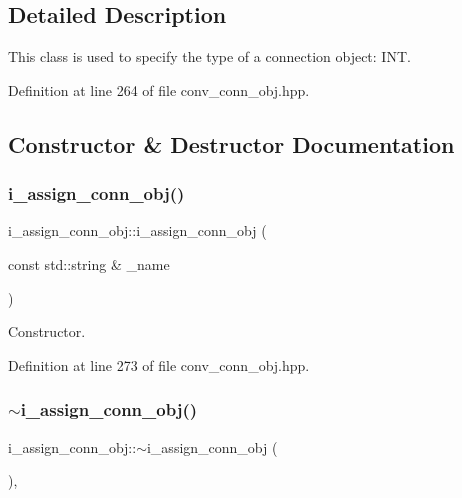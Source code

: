 \subsection{Detailed Description}
This class is used to specify the type of a connection object\+: I\+NT. 

Definition at line 264 of file conv\+\_\+conn\+\_\+obj.\+hpp.



\subsection{Constructor \& Destructor Documentation}
\mbox{\label{classi__assign__conn__obj_aa987d9ecde9d90d5376226743c7a8b93}} 
\subsubsection{\texorpdfstring{i\+\_\+assign\+\_\+conn\+\_\+obj()}{i\_assign\_conn\_obj()}}
{\footnotesize\ttfamily i\+\_\+assign\+\_\+conn\+\_\+obj\+::i\+\_\+assign\+\_\+conn\+\_\+obj (\begin{DoxyParamCaption}\item[{const std\+::string \&}]{\+\_\+name }\end{DoxyParamCaption})\hspace{0.3cm}{\ttfamily [inline]}}



Constructor. 



Definition at line 273 of file conv\+\_\+conn\+\_\+obj.\+hpp.

\mbox{\label{classi__assign__conn__obj_ae7272c8e50f65ccd5a389f3258f89542}} 
\subsubsection{\texorpdfstring{$\sim$i\+\_\+assign\+\_\+conn\+\_\+obj()}{~i\_assign\_conn\_obj()}}
{\footnotesize\ttfamily i\+\_\+assign\+\_\+conn\+\_\+obj\+::$\sim$i\+\_\+assign\+\_\+conn\+\_\+obj (\begin{DoxyParamCaption}{ }\end{DoxyParamCaption})\hspace{0.3cm}{\ttfamily [override]}, {\ttfamily [default]}}



